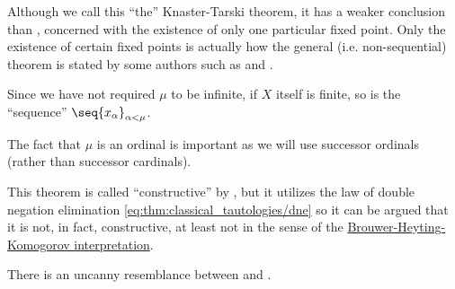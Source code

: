 \begin{comments}
  \item Although we call this \enquote{the} Knaster-Tarski theorem, it has a weaker conclusion than , concerned with the existence of only one particular fixed point. Only the existence of certain fixed points is actually how the general (i.e. non-sequential) theorem is stated by some authors such as  and .

  \item Since we have not required \( \mu \) to be infinite, if \( X \) itself is finite, so is the \enquote{sequence} \( \seq{ x_\alpha }_{\alpha < \mu} \).

  \item The fact that \( \mu \) is an ordinal is important as we will use successor ordinals (rather than successor cardinals).

  \item This theorem is called \enquote{constructive} by , but it utilizes the law of double negation elimination \eqref{eq:thm:classical_tautologies/dne} so it can be argued that it is not, in fact, constructive, at least not in the sense of the \hyperref[con:brouwer_heyting_kolmogorov_interpretation]{Brouwer-Heyting-Komogorov interpretation}.

  \item There is an uncanny resemblance between  and .
\end{comments}
